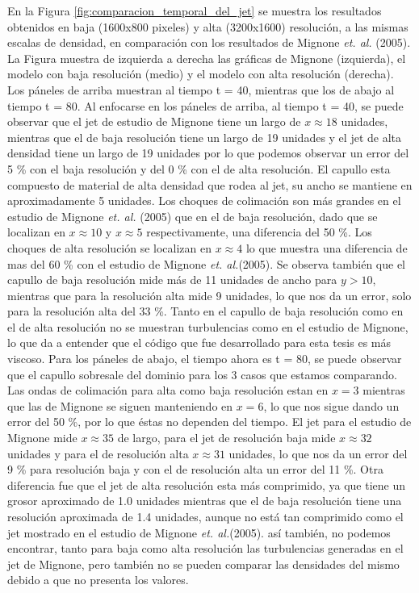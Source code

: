 \documentclass[12pt,a4paper]{book}
\begin{document}
En la Figura \ref{fig:comparacion_temporal_del_jet} se muestra los resultados obtenidos en baja 
(1600x800 pixeles) y alta (3200x1600) resolución, a 
las mismas escalas de densidad, en comparación con los resultados de Mignone \emph{et. al.} (2005).
La Figura muestra de izquierda a derecha las gráficas de Mignone (izquierda), el modelo con baja resolución 
(medio) y el modelo con alta resolución (derecha). Los páneles de arriba muestran al tiempo t = 40, mientras que los 
de abajo al tiempo t = 80.
Al enfocarse en los páneles de arriba, al tiempo t = 40, se puede observar que el jet de estudio de Mignone tiene un largo 
de $x \approx 18$ unidades, mientras que el de baja resolución tiene un largo de 19 unidades y 
el jet de alta densidad  tiene un largo de 19 unidades por lo que podemos observar un error del 5 \% 
con el baja resolución y del 0 \% con el de alta resolución. El capullo esta compuesto de material de alta densidad 
que rodea al jet, su ancho se mantiene en aproximadamente 5 unidades.
Los choques de colimación son más grandes en el estudio de Mignone \emph{et. al.} (2005)
que en el de baja resolución, 
dado que se localizan en $x \approx 10$ y $x \approx 5$ respectivamente, una diferencia del 50 \%. 
Los choques de alta resolución se localizan en $x \approx 4$  lo que muestra una diferencia de mas del 
60 \% con el estudio de Mignone \emph{et. al.}(2005).
Se observa también que el capullo de baja resolución mide más de 11 unidades de ancho para $y > 10$, 
mientras que para la resolución alta mide 9 unidades, lo que nos da un error, solo para la resolución alta del 33 \%.
Tanto en el capullo de baja resolución como en el de alta resolución no se muestran turbulencias 
como en el estudio de Mignone, lo que da a entender  que el código que fue desarrollado para esta tesis 
es más viscoso.
Para los páneles de abajo, el tiempo ahora es t = 80, se puede observar que el capullo sobresale del dominio para los 
3 casos que estamos comparando. Las ondas de colimación para alta como baja resolución
estan en $x = 3$ mientras que las de Mignone se siguen manteniendo en $x = 6$, lo que nos sigue dando un error 
del 50 \%, por lo que éstas no dependen del tiempo. 
El jet para el estudio de Mignone mide $x \approx 35$ de largo, para el jet de resolución baja mide $x \approx 32$ unidades y 
para el de resolución alta $x \approx 31$ unidades, lo que nos da un error del 9 \% para resolución baja y con el 
de resolución alta un error del 11 \%.
Otra diferencia fue que el jet de 
alta resolución esta más comprimido, ya que tiene un grosor aproximado de 1.0 unidades 
mientras que el de baja resolución tiene una resolución aproximada de 1.4 unidades, 
aunque no está tan comprimido como el jet mostrado en el estudio de Mignone \emph{et. al.}(2005). así también, no podemos encontrar, tanto para baja como 
alta resolución las turbulencias generadas en el jet de Mignone, pero también no se pueden comparar las densidades del 
mismo debido a que no presenta los valores.
\end{document}
